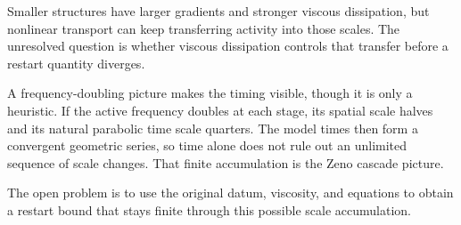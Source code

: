 Smaller structures have larger gradients and stronger viscous dissipation, but nonlinear transport can keep transferring activity into those scales.
The unresolved question is whether viscous dissipation controls that transfer before a restart quantity diverges.

A frequency-doubling picture makes the timing visible, though it is only a heuristic.
If the active frequency doubles at each stage, its spatial scale halves and its natural parabolic time scale quarters.
The model times then form a convergent geometric series, so time alone does not rule out an unlimited sequence of scale changes.
That finite accumulation is the Zeno cascade picture.

The open problem is to use the original datum, viscosity, and equations to obtain a restart bound that stays finite through this possible scale accumulation.
